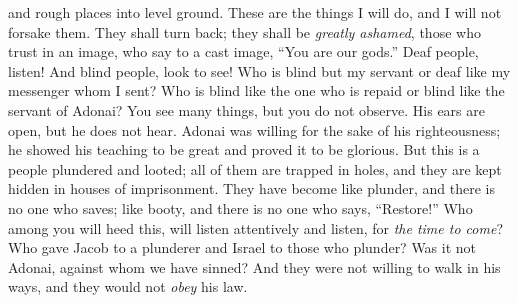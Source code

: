 \begin{biblechapter}
and rough places into level ground. 
These are the things I will do, 
and I will not forsake them.
\verse They shall turn back; 
they shall be \textit{greatly ashamed}, 
those who trust in an image, 
who say to a cast image, “You are our gods.”
 Deaf people, listen! 
And blind people, look to see!
\verse Who is blind but my servant 
or deaf like my messenger whom I sent? 
Who is blind like the one who is repaid 
or blind like the servant of Adonai?
\verse You see many things, but you do not observe. 
His ears are open, but he does not hear.
\verse Adonai was willing for the sake of his righteousness; 
he showed his teaching to be great and proved it to be glorious.
\verse But this is a people plundered and looted; all of them are trapped in holes, 
and they are kept hidden in houses of imprisonment. 
They have become like plunder, and there is no one who saves; 
like booty, and there is no one who says, “Restore!”
\verse Who among you will heed this, 
will listen attentively and listen, for \textit{the time to come}?
\verse Who gave Jacob to a plunderer 
and Israel to those who plunder? Was it not Adonai, against whom we have sinned?
\verse And they were not willing to walk in his ways, 
and they would not \textit{obey} his law.
\end{biblechapter}


